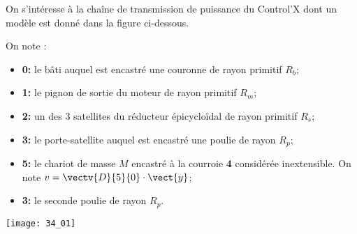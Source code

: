 \normaltrue \difficilefalse \tdifficilefalse
\correctionfalse

\setcounter{question}{0}
\ifcorrection
\else
{}
\fi

\ifprof
\else
On s'intéresse à la chaîne de transmission de puissance du Control'X dont un modèle est donné dans la figure ci-dessous.

On note : 
\begin{itemize}
\item \textbf{0:} le bâti auquel est encastré une couronne de rayon primitif $R_b$;
\item \textbf{1:} le pignon de sortie du moteur de rayon primitif $R_m$;
\item \textbf{2:} un des 3 satellites du réducteur épicycloïdal de rayon primitif $R_s$;
\item \textbf{3:} le porte-satellite auquel est encastré une poulie de rayon $R_p$;
\item \textbf{5:} le chariot de masse $M$ encastré à la courroie \textbf{4} considérée inextensible. On note $v=\vectv{D}{5}{0}\cdot \vect{y}$;
\item \textbf{3:} le seconde poulie de rayon $R_p$.
\end{itemize}

\begin{center}
\centering
\texttt{[image: 34\_01]}
\end{center}
\fi

\ifprof	
\else
\fi

\ifprof
\else
\fi



\ifprof	
\else
\fi

\ifprof
\else
{}
\fi